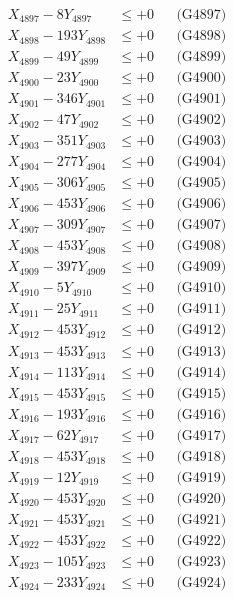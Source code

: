 \documentclass[a4paper,10pt]{article}
\begin{document}
{\begin{align}
X_{4897} - 8Y_{4897} &\leq +0 && \text{(G4897)} \\
X_{4898} - 193Y_{4898} &\leq +0 && \text{(G4898)} \\
X_{4899} - 49Y_{4899} &\leq +0 && \text{(G4899)} \\
X_{4900} - 23Y_{4900} &\leq +0 && \text{(G4900)} \\
\allowbreak
X_{4901} - 346Y_{4901} &\leq +0 && \text{(G4901)} \\
X_{4902} - 47Y_{4902} &\leq +0 && \text{(G4902)} \\
X_{4903} - 351Y_{4903} &\leq +0 && \text{(G4903)} \\
X_{4904} - 277Y_{4904} &\leq +0 && \text{(G4904)} \\
X_{4905} - 306Y_{4905} &\leq +0 && \text{(G4905)} \\
X_{4906} - 453Y_{4906} &\leq +0 && \text{(G4906)} \\
X_{4907} - 309Y_{4907} &\leq +0 && \text{(G4907)} \\
X_{4908} - 453Y_{4908} &\leq +0 && \text{(G4908)} \\
X_{4909} - 397Y_{4909} &\leq +0 && \text{(G4909)} \\
X_{4910} - 5Y_{4910} &\leq +0 && \text{(G4910)} \\
\allowbreak
X_{4911} - 25Y_{4911} &\leq +0 && \text{(G4911)} \\
X_{4912} - 453Y_{4912} &\leq +0 && \text{(G4912)} \\
X_{4913} - 453Y_{4913} &\leq +0 && \text{(G4913)} \\
X_{4914} - 113Y_{4914} &\leq +0 && \text{(G4914)} \\
X_{4915} - 453Y_{4915} &\leq +0 && \text{(G4915)} \\
X_{4916} - 193Y_{4916} &\leq +0 && \text{(G4916)} \\
X_{4917} - 62Y_{4917} &\leq +0 && \text{(G4917)} \\
X_{4918} - 453Y_{4918} &\leq +0 && \text{(G4918)} \\
X_{4919} - 12Y_{4919} &\leq +0 && \text{(G4919)} \\
X_{4920} - 453Y_{4920} &\leq +0 && \text{(G4920)} \\
\allowbreak
X_{4921} - 453Y_{4921} &\leq +0 && \text{(G4921)} \\
X_{4922} - 453Y_{4922} &\leq +0 && \text{(G4922)} \\
X_{4923} - 105Y_{4923} &\leq +0 && \text{(G4923)} \\
X_{4924} - 233Y_{4924} &\leq +0 && \text{(G4924)} \\

\end{align}}
\end{document}
